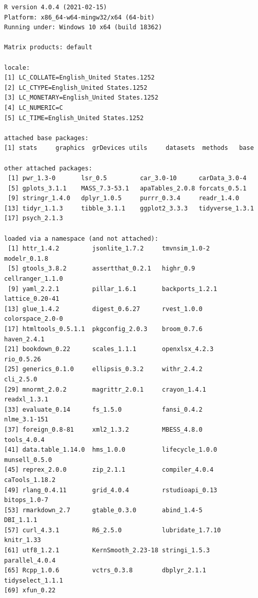 \documentclass[
  english,
]{book}
\begin{document}
\begin{verbatim}
R version 4.0.4 (2021-02-15)
Platform: x86_64-w64-mingw32/x64 (64-bit)
Running under: Windows 10 x64 (build 18362)

Matrix products: default

locale:
[1] LC_COLLATE=English_United States.1252 
[2] LC_CTYPE=English_United States.1252   
[3] LC_MONETARY=English_United States.1252
[4] LC_NUMERIC=C                          
[5] LC_TIME=English_United States.1252    

attached base packages:
[1] stats     graphics  grDevices utils     datasets  methods   base     

other attached packages:
 [1] pwr_1.3-0       lsr_0.5         car_3.0-10      carData_3.0-4  
 [5] gplots_3.1.1    MASS_7.3-53.1   apaTables_2.0.8 forcats_0.5.1  
 [9] stringr_1.4.0   dplyr_1.0.5     purrr_0.3.4     readr_1.4.0    
[13] tidyr_1.1.3     tibble_3.1.1    ggplot2_3.3.3   tidyverse_1.3.1
[17] psych_2.1.3    

loaded via a namespace (and not attached):
 [1] httr_1.4.2         jsonlite_1.7.2     tmvnsim_1.0-2      modelr_0.1.8      
 [5] gtools_3.8.2       assertthat_0.2.1   highr_0.9          cellranger_1.1.0  
 [9] yaml_2.2.1         pillar_1.6.1       backports_1.2.1    lattice_0.20-41   
[13] glue_1.4.2         digest_0.6.27      rvest_1.0.0        colorspace_2.0-0  
[17] htmltools_0.5.1.1  pkgconfig_2.0.3    broom_0.7.6        haven_2.4.1       
[21] bookdown_0.22      scales_1.1.1       openxlsx_4.2.3     rio_0.5.26        
[25] generics_0.1.0     ellipsis_0.3.2     withr_2.4.2        cli_2.5.0         
[29] mnormt_2.0.2       magrittr_2.0.1     crayon_1.4.1       readxl_1.3.1      
[33] evaluate_0.14      fs_1.5.0           fansi_0.4.2        nlme_3.1-151      
[37] foreign_0.8-81     xml2_1.3.2         MBESS_4.8.0        tools_4.0.4       
[41] data.table_1.14.0  hms_1.0.0          lifecycle_1.0.0    munsell_0.5.0     
[45] reprex_2.0.0       zip_2.1.1          compiler_4.0.4     caTools_1.18.2    
[49] rlang_0.4.11       grid_4.0.4         rstudioapi_0.13    bitops_1.0-7      
[53] rmarkdown_2.7      gtable_0.3.0       abind_1.4-5        DBI_1.1.1         
[57] curl_4.3.1         R6_2.5.0           lubridate_1.7.10   knitr_1.33        
[61] utf8_1.2.1         KernSmooth_2.23-18 stringi_1.5.3      parallel_4.0.4    
[65] Rcpp_1.0.6         vctrs_0.3.8        dbplyr_2.1.1       tidyselect_1.1.1  
[69] xfun_0.22         
\end{verbatim}

  
\end{document}

